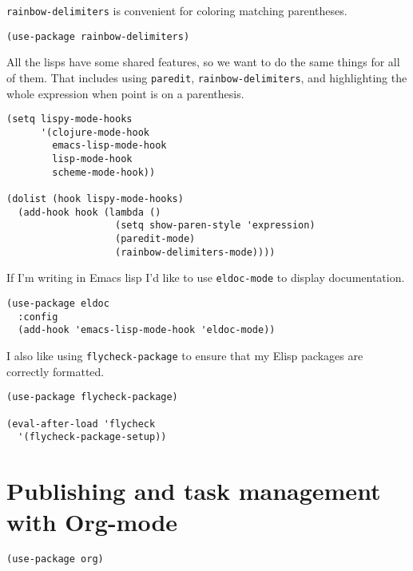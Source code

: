 \documentclass{article}
\begin{document}
\begin{enumerate}
\texttt{rainbow-delimiters} is convenient for coloring matching parentheses.

\begin{verbatim}
(use-package rainbow-delimiters)
\end{verbatim}

All the lisps have some shared features, so we want to do the same things for
all of them. That includes using \texttt{paredit}, \texttt{rainbow-delimiters}, and
highlighting the whole expression when point is on a parenthesis.

\begin{verbatim}
(setq lispy-mode-hooks
	  '(clojure-mode-hook
		emacs-lisp-mode-hook
		lisp-mode-hook
		scheme-mode-hook))

(dolist (hook lispy-mode-hooks)
  (add-hook hook (lambda ()
				   (setq show-paren-style 'expression)
				   (paredit-mode)
				   (rainbow-delimiters-mode))))
\end{verbatim}

If I'm writing in Emacs lisp I'd like to use \texttt{eldoc-mode} to display
documentation.

\begin{verbatim}
(use-package eldoc
  :config
  (add-hook 'emacs-lisp-mode-hook 'eldoc-mode))
\end{verbatim}

I also like using \texttt{flycheck-package} to ensure that my Elisp packages are
correctly formatted.

\begin{verbatim}
(use-package flycheck-package)

(eval-after-load 'flycheck
  '(flycheck-package-setup))
\end{verbatim}
\end{enumerate}








\section{Publishing and task management with Org-mode}
\label{sec:org301659a}

\begin{verbatim}
(use-package org)
\end{verbatim}
\end{document}

